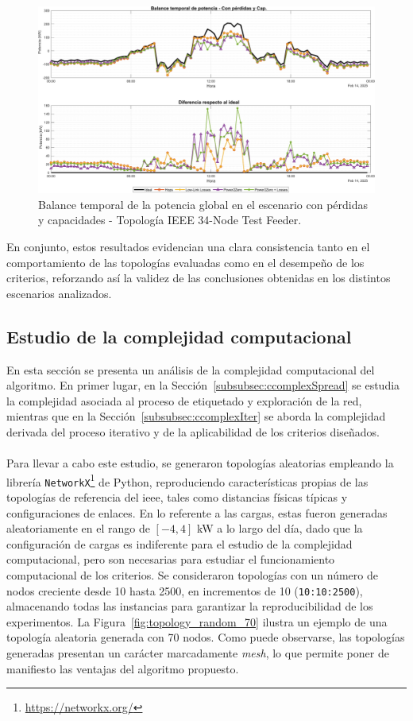 \begin{figure}[ht!]
    \centering
    \includegraphics[width=\textwidth]{fig/07_bloste/bloste_21.pdf}
    \caption{Balance temporal de la potencia global en el escenario con pérdidas y capacidades - Topología IEEE 34-Node Test Feeder.}
    \label{fig:v2_fig_base_TempPowerBalance_LossyCap}
\end{figure}


En conjunto, estos resultados evidencian una clara consistencia tanto en el comportamiento de las topologías evaluadas como en el desempeño de los criterios, reforzando así la validez de las conclusiones obtenidas en los distintos escenarios analizados.


\subsection{Estudio de la complejidad computacional}

En esta sección se presenta un análisis de la complejidad computacional del algoritmo. En primer lugar, en la Sección~\ref{subsubsec:ccomplexSpread} se estudia la complejidad asociada al proceso de etiquetado y exploración de la red, mientras que en la Sección~\ref{subsubsec:ccomplexIter} se aborda la complejidad derivada del proceso iterativo y de la aplicabilidad de los criterios diseñados.\\
\\
Para llevar a cabo este estudio, se generaron topologías aleatorias empleando la librería \texttt{NetworkX}\footnote{\url{https://networkx.org/}} de Python, reproduciendo características propias de las topologías de referencia del \gls{ieee}, tales como distancias físicas típicas y configuraciones de enlaces. En lo referente a las cargas, estas fueron generadas aleatoriamente en el rango de $[-4, 4]$ kW a lo largo del día, dado que la configuración de cargas es indiferente para el estudio de la complejidad computacional, pero son necesarias para estudiar el funcionamiento computacional de los criterios. Se consideraron topologías con un número de nodos creciente desde 10 hasta 2500, en incrementos de 10 (\texttt{10:10:2500}), almacenando todas las instancias para garantizar la reproducibilidad de los experimentos. La Figura~\ref{fig:topology_random_70} ilustra un ejemplo de una topología aleatoria generada con 70 nodos. Como puede observarse, las topologías generadas presentan un carácter marcadamente \textit{mesh}, lo que permite poner de manifiesto las ventajas del algoritmo propuesto.

